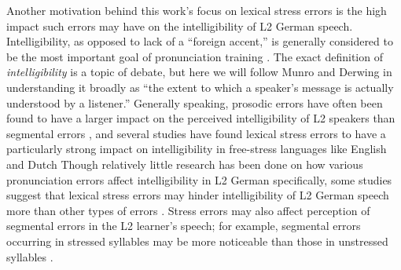 \documentclass[a4paper]{article}
\newcommand{\TODO}[1]{{\color{red}\textbf{[TODO #1]}}}
\begin{document}
	
	
	Another motivation behind this work's focus on lexical stress errors is the high impact such errors may have on the intelligibility of L2 German speech.
	Intelligibility, as opposed to lack of a “foreign accent,” is generally considered to be the most important goal of pronunciation training \cite{Munro1999,Neri2002,Derwing2005,Field2005,Witt2012}. The exact definition of \textit{intelligibility} is a topic of debate,
	but here we will follow Munro and Derwing \cite[p.~289]{Munro1999} in understanding it broadly as ``the extent to which a speaker’s message is actually understood by a listener.''
	Generally speaking, prosodic errors have often been found to have a larger impact on the perceived intelligibility of L2 speakers than segmental errors 
	\cite{Derwing2005,Witt2012}, and several studies have found lexical stress errors to have a particularly strong impact on intelligibility in free-stress languages like English and Dutch \cite{Cutler2005,Field2005} 
	Though relatively little research has been done on how various pronunciation errors affect intelligibility in L2 German specifically, some studies suggest that 
	lexical stress errors 
	may hinder intelligibility of L2 German speech more than other types of errors \cite{Hirschfeld1994,Hirschfeld2007}.
	Stress errors may also affect perception of segmental errors in the L2 learner’s speech; for example, segmental errors occurring in stressed syllables may be more noticeable than those in unstressed syllables \cite{Cutler2005,Michaux2012}. 
	
\end{document}
